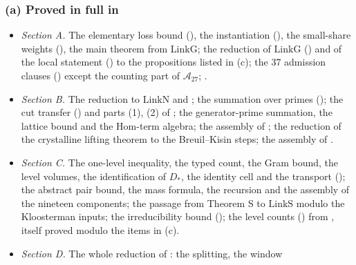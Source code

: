 \documentclass[10pt]{amsart}
\theoremstyle{definition}
\theoremstyle{remark}
\begin{document}
\subsubsection*{(a) Proved in full in \cite{Annex}}
\begin{itemize}
\item \emph{Section A.} The elementary loss bound
(\cite[Theorem~\ref{A-i1:thm-elementary}]{Annex}), the instantiation
(\cite[Theorem~\ref{A-i1:thm-setting}]{Annex}), the small-share weights
(\cite[Proposition~\ref{A-i1:prop-chosenW}]{Annex}), the main theorem
\cite[Theorem~\ref{A-i1:thm-loss}]{Annex} from $\mathrm{LinkG}$; the
reduction of $\mathrm{LinkG}$ (\cite[Proposition~\ref{A-i1:prop-linkG}]{Annex})
and of the local statement (\cite[Proposition~\ref{A-i1:prop-loc}]{Annex}) to
the propositions listed in (c); the $37$ admission clauses
(\cite[Proposition~\ref{A-i1:prop-adm}]{Annex}) except the counting part of
$\mathcal A_{27}$; \cite[Propositions~\ref{A-i1:prop-Fm}, \ref{A-i1:prop-A19c},
\ref{A-i1:prop-A21}]{Annex}.
\item \emph{Section B.} The reduction to $\mathrm{LinkN}$ and
\cite[Theorem~\ref{A-i2:thm-div}]{Annex}; the summation over primes
(\cite[Theorems~\ref{A-i2:thm-summed}, \ref{A-i2:thm-export}]{Annex}); the cut
transfer (\cite[Theorem~\ref{A-i2:thm-transfer}]{Annex}) and parts (1), (2)
of \cite[Proposition~\ref{A-i2:prop-cut}]{Annex}; the generator-prime
summation, the lattice bound and the $\mathrm{Hom}$-term algebra; the
assembly of \cite[Theorem~\ref{A-i2:thm-linkN}]{Annex}; the reduction of the
crystalline lifting theorem \cite[Proposition~\ref{A-i2:prop-lift}]{Annex} to
the Breuil--Kisin steps; the assembly of
\cite[Proposition~\ref{A-i2:prop-P1}]{Annex}.
\item \emph{Section C.} The one-level inequality, the typed count, the Gram
bound, the level volumes, the identification of $D_*$, the identity cell
and the transport (\cite[\S\S\ref{A-i3:S-ssec-onelevel}--\ref{A-i3:S-ssec-pf-transport}]{Annex});
the abstract pair bound, the mass formula, the recursion and the assembly
of the nineteen components; the passage from Theorem S to $\mathrm{LinkS}$
modulo the Kloosterman inputs; the irreducibility bound
(\cite[Theorem~\ref{A-i3:thm-linkIRR}]{Annex}); the level counts
(\cite[Propositions~\ref{A-i3:prop-part5}, \ref{A-i3:prop-countF}]{Annex})
from \cite[Proposition~\ref{A-i3:prop-V}]{Annex}, itself proved modulo the
items in (c).
\item \emph{Section D.} The whole reduction of
\cite[Theorem~\ref{A-i5:thm-vwin}]{Annex}: the splitting, the window

\end{itemize}
\end{document}

